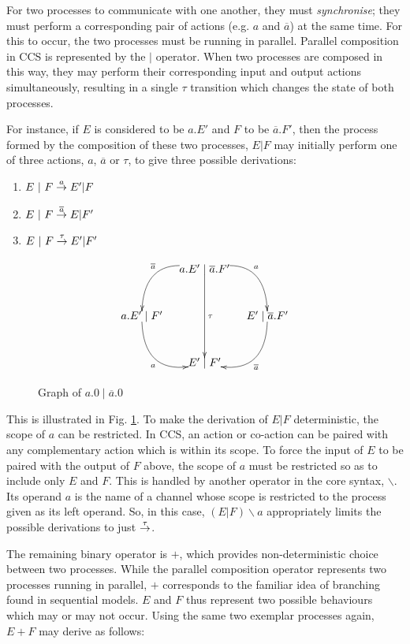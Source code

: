 For two processes to communicate with one another, they must
\emph{synchronise}; they must perform a corresponding pair of actions
(e.g. $a$ and $\overline{a}$) at the same time.  For this to occur,
the two processes must be running in parallel.  Parallel composition
in CCS is represented by the $|$ operator.  When two processes are
composed in this way, they may perform their corresponding input and
output actions simultaneously, resulting in a single $\tau$ transition
which changes the state of both processes.

For instance, if $E$ is considered to be $a.E'$ and $F$ to be
$\overline{a}.F'$, then the process formed by the composition of these
two processes, $E|F$ may initially perform one of three actions, $a$,
$\overline{a}$ or $\tau$, to give three possible derivations:

\begin{enumerate}
\item $E\ |\ F \stackrel{a}{\rightarrow} E'|F$
\item $E\ |\ F \stackrel{\overline{a}}{\rightarrow} E|F'$
\item $E\ |\ F \stackrel{\tau}{\rightarrow} E'|F'$
\end{enumerate}

\begin{figure}  
  \centering
\[
\xy
(20,0)*{a.E' \mid \overline{a}.F'}="1";
(0,-15)*{a.E' \mid F'}="2";
(40,-15)*{E' \mid \overline{a}.F'}="3";
(20,-30)*{E' \mid F'}="4";
{\ar@/^2pc/^{a} "1";"3"};
{\ar@/_2pc/_{\overline{a}} "1";"2"};
{\ar@/^2pc/^{\overline{a}} "3";"4"};
{\ar@/_2pc/_{a} "2";"4"};
{\ar^{\tau} "1";"4"};
\endxy
\]
  \caption{Graph of $a.0 \mid \overline{a}.0$}
  \label{fig:graph1}
\end{figure}

This is illustrated in Fig. \ref{fig:graph1}.  To make the derivation
of $E|F$ deterministic, the scope of $a$ can be restricted.  In CCS,
an action or co-action can be paired with any complementary action
which is within its scope.  To force the input of $E$ to be paired
with the output of $F$ above, the scope of $a$ must be restricted so
as to include only $E$ and $F$.  This is handled by another operator
in the core syntax, $\backslash$.  Its operand $a$ is the name of a
channel whose scope is restricted to the process given as its left
operand.  So, in this case, $(E|F)\backslash a$ appropriately limits
the possible derivations to just $\stackrel{\tau}{\rightarrow}$.

The remaining binary operator is $+$, which provides non-deterministic
choice between two processes.  While the parallel composition operator
represents two processes running in parallel, $+$ corresponds to the
familiar idea of branching found in sequential models.  $E$ and $F$
thus represent two possible behaviours which may or may not occur.
Using the same two exemplar processes again, $E + F$ may derive as
follows:

